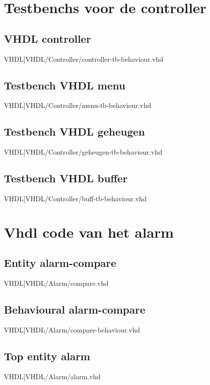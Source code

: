 \section{Testbenchs voor de controller}
\subsection{VHDL controller}
\scriptsize 
 VHDL]{VHDL/Controller/controller-tb-behaviour.vhd}
\normalsize
\label{code:tb_controller}
\subsection{Testbench VHDL menu}
\scriptsize 
 VHDL]{VHDL/Controller/menu-tb-behaviour.vhd}
\normalsize
\label{code:tb_menu}
\subsection{Testbench VHDL geheugen}
\scriptsize 
 VHDL]{VHDL/Controller/geheugen-tb-behaviour.vhd}
\normalsize
\label{code:tb_geheugen}
\subsection{Testbench VHDL buffer}
\scriptsize 
 VHDL]{VHDL/Controller/buff-tb-behaviour.vhd}
\normalsize
\label{code:tb_buffer}

\section{Vhdl code van het alarm}
\label{Ap:code_alarm}
\subsection{Entity alarm-compare}
\scriptsize 
 VHDL]{VHDL/Alarm/compare.vhd}
\normalsize
\label{code:ent_alarm_compare}
\subsection{Behavioural alarm-compare}
\scriptsize 
 VHDL]{VHDL/Alarm/compare-behaviour.vhd}
\normalsize
\label{code:beh_alarm_compare}
\subsection{Top entity alarm}
\scriptsize 
 VHDL]{VHDL/Alarm/alarm.vhd}
\normalsize
\label{code:ent_alarm}

